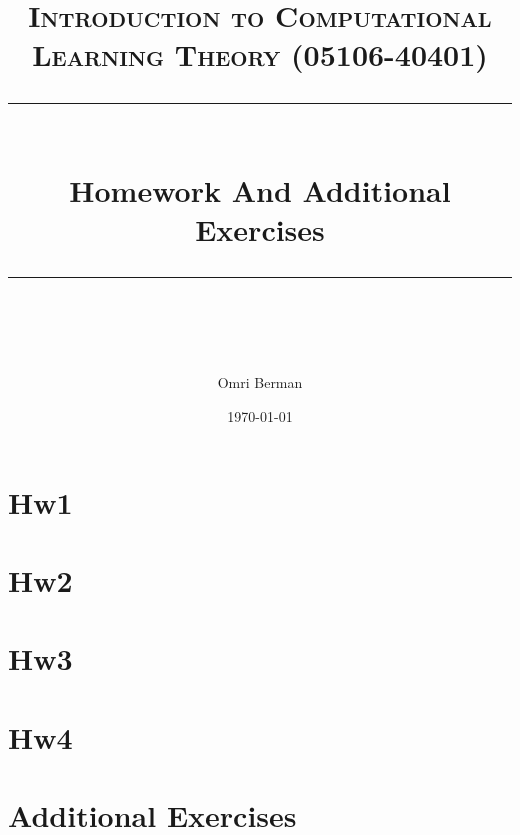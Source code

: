 \documentclass{article} %
\title{
\normalfont \normalsize 
\textsc{Introduction to Computational Learning Theory (05106-40401)} \\
[10pt] 
\rule{\linewidth}{0.5pt} \\[6pt] 
\huge Homework And Additional Exercises \\
\rule{\linewidth}{2pt}  \\[10pt]
}
\author{Omri Berman}
\date{\normalsize \today}
\begin{document}
\maketitle
\noindent

{
  \hypersetup{linkcolor=black}
  \tableofcontents
}
\pagebreak

\section{Hw1}


\section{Hw2}


\section{Hw3}


\section{Hw4}


\section{Additional Exercises}

\end{document}
